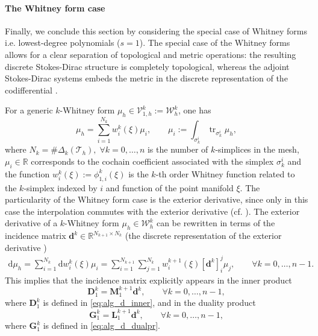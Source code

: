 \documentclass{elsarticle}
\newcommand{\revOne}[1]{{\color{black}#1}}
\newcommand{\revTwo}[1]{{\color{black}#1}}
\renewcommand\d{\ensuremath{\mathrm{d}}}
\newcommand{\bbR}{\mathbb{R}}
\DeclareMathOperator{\tr}{tr}
\begin{document}
\paragraph{The Whitney form case}
Finally, we conclude this section by considering the special case of Whitney forms i.e. lowest-degree polynomials ($s=1$). The special case of the Whitney forms allows for a clear separation of topological and metric operations: the resulting discrete Stokes-Dirac structure is completely topological, whereas the adjoint Stokes-Dirac systems embeds the metric in the discrete representation of the codifferential \cite{bochev2006}.
 
For a generic $k$-Whitney form $\mu_h \in \mathcal{V}_{1, h}^k:= \mathcal{W}_h^k$, one has 
\begin{equation}\label{eq:whitney_basis}
    \mu_h = \sum_{i=1}^{N_{k}} w_i^{k}(\xi) \mu_i, \qquad \mu_i := \int_{\sigma_k^i} \tr_{\sigma_k^i} \mu_h, 
\end{equation}
where $N_k = \# \Delta_{k}(\mathcal{T}_h), \; \forall k=0, \dots, n$ is the number of $k$-simplices in the mesh, $\mu_i\in \bbR$ corresponds to the cochain coefficient associated with the simplex $\sigma_k^i$ and the function $w_i^{k}(\xi):= \phi_{1, i}^k(\xi)$ is the $k$-th order Whitney function related to the $k$-simplex indexed by $i$ and function of the point manifold $\xi$. The particularity of the Whitney form case is the exterior derivative, since only in this case the interpolation commutes with the exterior derivative (cf. \cite[Section IV.27]{whitney1957}). The exterior derivative of a $k$-Whitney form $\mu_h \in \mathcal{W}_h^k$ can be rewritten in terms of the \revTwo{incidence} matrix $\mathbf{d}^k \in \mathbb{R}^{N_{k+1}\times N_k}$ \revTwo{(the discrete representation of the exterior derivative \cite{hiptmair2001,kreeft2011mimetic})}
\begin{equation}\label{eq:alg_d}
\begin{aligned}
    \d \mu_h = \sum_{i=1}^{N_k} \d w_i^{k}(\xi) \mu_i = \sum_{i=1}^{N_{k+1}} \sum_{j=1}^{N_{k}} w_i^{k+1}(\xi) [\mathbf{d}^{k}]_{i}^j \mu_j, \qquad \forall k = 0, \dots, n-1.
\end{aligned}
\end{equation}
This implies that the incidence matrix  explicitly appears in the inner product
\revOne{
\begin{equation}\label{eq:alg_d_inner_W}
    \mathbf{D}_1^{k} = \mathbf{M}^{k+1}_1 \mathbf{d}^{k}, \qquad \forall k=0, \dots, n-1,
\end{equation}
where $\mathbf{D}_1^{k}$ is defined in \eqref{eq:alg_d_inner}, 
and in the duality product
\begin{equation}\label{eq:alg_d_dualpr_W}
    \mathbf{G}_1^{k} = \mathbf{L}^{k+1}_1 \mathbf{d}^{k}, \qquad \forall k=0, \dots, n-1,
\end{equation}
where $\mathbf{G}_1^{k}$ is defined in \eqref{eq:alg_d_dualpr}.
}
\end{document}

